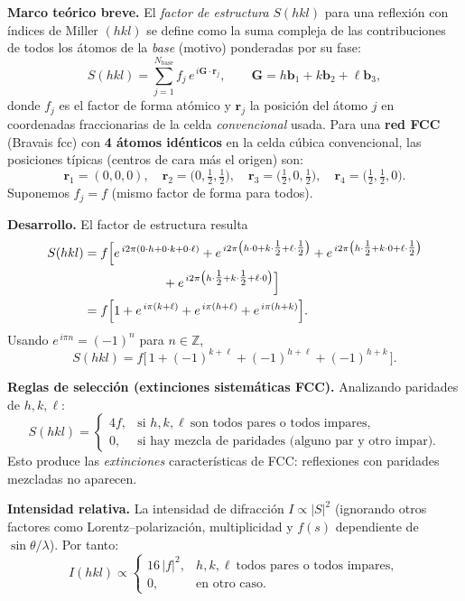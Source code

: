 \documentclass{article}
\begin{document}
\textbf{Marco teórico breve.}  
El \emph{factor de estructura} \(S(hkl)\) para una reflexión con índices de Miller \((hkl)\) se define como la suma compleja de las contribuciones de todos los átomos de la \emph{base} (motivo) ponderadas por su fase:
\[
S(hkl)=\sum_{j=1}^{N_{\text{base}}} f_j\,e^{\,i\mathbf{G}\cdot \mathbf{r}_j},\qquad 
\mathbf{G}=h\mathbf{b}_1+k\mathbf{b}_2+\ell\mathbf{b}_3,
\]
donde \(f_j\) es el factor de forma atómico y \(\mathbf{r}_j\) la posición del átomo \(j\) en coordenadas fraccionarias de la celda \emph{convencional} usada.  
Para una \textbf{red FCC} (Bravais fcc) con \textbf{4 átomos idénticos} en la celda cúbica convencional, las posiciones típicas (centros de cara más el origen) son:
\[
\mathbf{r}_1=(0,0,0),\quad 
\mathbf{r}_2=\Big(0,\tfrac12,\tfrac12\Big),\quad
\mathbf{r}_3=\Big(\tfrac12,0,\tfrac12\Big),\quad
\mathbf{r}_4=\Big(\tfrac12,\tfrac12,0\Big).
\]
Suponemos \(f_j=f\) (mismo factor de forma para todos).

\medskip
\textbf{Desarrollo.}  
El factor de estructura resulta
\[
\begin{aligned}
S(hkl)
&= f\Big[
e^{\,i2\pi(0\cdot h+0\cdot k+0\cdot \ell)}
+e^{\,i2\pi\big(h\cdot 0+k\cdot\tfrac12+\ell\cdot\tfrac12\big)}
+e^{\,i2\pi\big(h\cdot\tfrac12+k\cdot 0+\ell\cdot\tfrac12\big)} \\
&\hspace{2.2cm}
+e^{\,i2\pi\big(h\cdot\tfrac12+k\cdot\tfrac12+\ell\cdot 0\big)}
\Big] \\
&= f\Big[
1
+e^{\,i\pi(k+\ell)}
+e^{\,i\pi(h+\ell)}
+e^{\,i\pi(h+k)}
\Big].
\end{aligned}
\]
Usando \(e^{\,i\pi n}=(-1)^n\) para \(n\in\mathbb{Z}\),
\[
\boxed{\,S(hkl)=
f\Big[\,1+(-1)^{k+\ell}+(-1)^{h+\ell}+(-1)^{h+k}\,\Big].\,}
\]

\medskip
\textbf{Reglas de selección (extinciones sistemáticas FCC).}  
Analizando paridades de \(h,k,\ell\):
\[
S(hkl)=\begin{cases}
4f, & \text{si } h,k,\ell\ \text{son todos pares o todos impares},\\[4pt]
0, & \text{si hay mezcla de paridades (alguno par y otro impar).}
\end{cases}
\]
Esto produce las \emph{extinciones} características de FCC: reflexiones con paridades mezcladas no aparecen.

\medskip
\textbf{Intensidad relativa.}  
La intensidad de difracción \(I\propto |S|^2\) (ignorando otros factores como Lorentz–polarización, multiplicidad y \(f(s)\) dependiente de \(\sin\theta/\lambda\)). Por tanto:
\[
I(hkl)\propto
\begin{cases}
16\,|f|^2, & h,k,\ell\ \text{todos pares o todos impares},\\[3pt]
0, & \text{en otro caso}.
\end{cases}
\]
\end{document}
